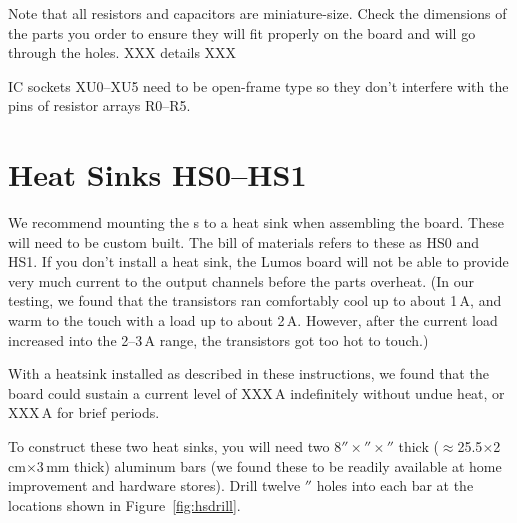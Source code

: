 \documentclass[letterpaper,twoside,onecolumn,openright,final]{memoir}
\begin{document}
Note that all resistors and capacitors are miniature-size.  Check the dimensions of the parts
you order to ensure they will fit properly on the board and will go through the holes.
XXX details XXX

IC sockets XU0--XU5 need to be open-frame type so they don't interfere with the pins of
resistor arrays R0--R5.

\section{Heat Sinks HS0--HS1}
We recommend mounting the s to a heat sink when assembling the board.  These
will need to be custom built.  The bill of materials refers to these as HS0 and HS1.  If you
don't install a heat sink, the Lumos board will not be able to provide very much current to
the output channels before the  parts overheat.  (In our testing, we found that
the transistors ran comfortably cool up to about 1\,A, and warm to the touch with
a load up to about 2\,A.  However, after the current load increased into the 2--3\,A range, 
the transistors got too hot to touch.)

With a heatsink installed as described in these instructions, we found that the board could
sustain a current level of XXX\,A indefinitely without undue heat, or XXX\,A for brief periods.

To construct these two heat sinks, you will need two 
8$''\times$$''\times$$''$ thick ($\approx$25.5$\times$2\,cm$\times$3\,mm thick) 
aluminum bars (we found these to be readily available at home improvement
and hardware stores).  Drill twelve $''$ holes into each bar at the locations shown in 
Figure~\ref{fig:hsdrill}.
\end{document}
